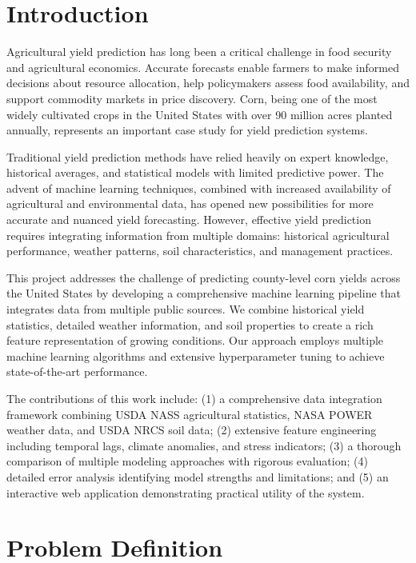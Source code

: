 \documentclass[conference]{IEEEtran}
\begin{document}
\section{Introduction}

Agricultural yield prediction has long been a critical challenge in food security and agricultural economics. Accurate forecasts enable farmers to make informed decisions about resource allocation, help policymakers assess food availability, and support commodity markets in price discovery. Corn, being one of the most widely cultivated crops in the United States with over 90 million acres planted annually, represents an important case study for yield prediction systems.

Traditional yield prediction methods have relied heavily on expert knowledge, historical averages, and statistical models with limited predictive power. The advent of machine learning techniques, combined with increased availability of agricultural and environmental data, has opened new possibilities for more accurate and nuanced yield forecasting. However, effective yield prediction requires integrating information from multiple domains: historical agricultural performance, weather patterns, soil characteristics, and management practices.

This project addresses the challenge of predicting county-level corn yields across the United States by developing a comprehensive machine learning pipeline that integrates data from multiple public sources. We combine historical yield statistics, detailed weather information, and soil properties to create a rich feature representation of growing conditions. Our approach employs multiple machine learning algorithms and extensive hyperparameter tuning to achieve state-of-the-art performance.

The contributions of this work include: (1) a comprehensive data integration framework combining USDA NASS agricultural statistics, NASA POWER weather data, and USDA NRCS soil data; (2) extensive feature engineering including temporal lags, climate anomalies, and stress indicators; (3) a thorough comparison of multiple modeling approaches with rigorous evaluation; (4) detailed error analysis identifying model strengths and limitations; and (5) an interactive web application demonstrating practical utility of the system.

\section{Problem Definition}
\end{document}

